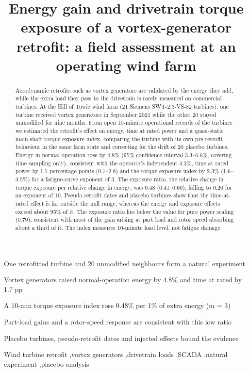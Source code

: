 \documentclass[preprint,12pt]{elsarticle}
\begin{document}
\doublespacing

\begin{frontmatter}

\title{Energy gain and drivetrain torque exposure of a vortex-generator retrofit: a field assessment at an operating wind farm}

\begin{abstract}
Aerodynamic retrofits such as vortex generators are validated by the energy they add, while the extra load they pass to the drivetrain is rarely measured on commercial turbines. At the Hill of Towie wind farm (21 Siemens SWT-2.3-VS-82 turbines), one turbine received vortex generators in September 2021 while the other 20 stayed unmodified for nine months. From open 10-minute operational records of the turbines we estimated the retrofit's effect on energy, time at rated power and a quasi-static main-shaft torque exposure index, comparing the turbine with its own pre-retrofit behaviour in the same farm state and correcting for the drift of 20 placebo turbines. Energy in normal operation rose by 4.8\% (95\% confidence interval 3.3--6.6\%, covering time sampling only), consistent with the operator's independent 4.3\%, time at rated power by 1.7 percentage points (0.7--2.8) and the torque exposure index by 2.3\% (1.6--3.5\%) for a fatigue-curve exponent of 3. The exposure ratio, the relative change in torque exposure per relative change in energy, was 0.48 (0.41--0.60), falling to 0.20 for an exponent of 10. Pseudo-retrofit dates and placebo turbines show that the time-at-rated effect is far outside the null range, whereas the energy and exposure effects exceed about 95\% of it. The exposure ratio lies below the value for pure power scaling (0.79), consistent with most of the gain arising at part load and rotor speed absorbing about a third of it. The index measures 10-minute load level, not fatigue damage.
\end{abstract}

\begin{highlights}
\item One retrofitted turbine and 20 unmodified neighbours form a natural experiment
\item Vortex generators raised normal-operation energy by 4.8\% and time at rated by 1.7 pp
\item A 10-min torque exposure index rose 0.48\% per 1\% of extra energy (m = 3)
\item Part-load gains and a rotor-speed response are consistent with this low ratio
\item Placebo turbines, pseudo-retrofit dates and injected effects bound the evidence
\end{highlights}

\begin{keyword}
Wind turbine retrofit \sep vortex generators \sep drivetrain loads \sep SCADA \sep natural experiment \sep placebo analysis
\end{keyword}

\end{frontmatter}
\end{document}
